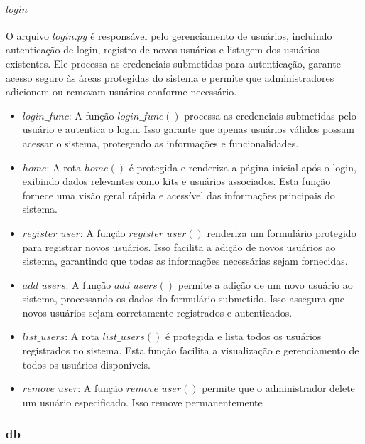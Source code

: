 \documentclass[conference, a4paper, 12pt]{IEEEtran}
\begin{document}
      \paragraph{$login$}
      O arquivo $login.py$ é responsável pelo gerenciamento de usuários, incluindo autenticação de login, registro de novos usuários e listagem dos usuários existentes. Ele processa as credenciais submetidas para autenticação, garante acesso seguro às áreas protegidas do sistema e permite que administradores adicionem ou removam usuários conforme necessário.
      \begin{itemize}
          \item $login\_func$: A função $login\_func()$ processa as credenciais submetidas pelo usuário e autentica o login. Isso garante que apenas usuários válidos possam acessar o sistema, protegendo as informações e funcionalidades.
      
          \item $home$: A rota $home()$ é protegida e renderiza a página inicial após o login, exibindo dados relevantes como kits e usuários associados. Esta função fornece uma visão geral rápida e acessível das informações principais do sistema.
      
          \item $register\_user$: A função $register\_user()$ renderiza um formulário protegido para registrar novos usuários. Isso facilita a adição de novos usuários ao sistema, garantindo que todas as informações necessárias sejam fornecidas.
      
          \item $add\_users$: A função $add\_users()$ permite a adição de um novo usuário ao sistema, processando os dados do formulário submetido. Isso assegura que novos usuários sejam corretamente registrados e autenticados.
      
          \item $list\_users$: A rota $list\_users()$ é protegida e lista todos os usuários registrados no sistema. Esta função facilita a visualização e gerenciamento de todos os usuários disponíveis.
      
          \item $remove\_user$: A função $remove\_user()$ permite que o administrador delete um usuário especificado. Isso remove permanentemente
      \end{itemize}
      
\subsubsection{db}
\end{document}
